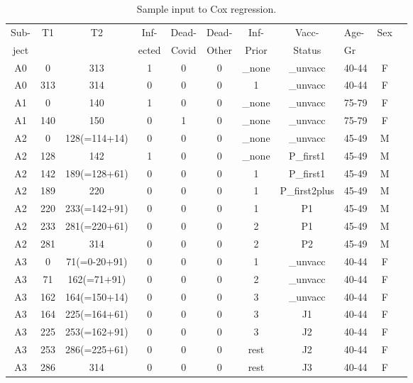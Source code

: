 \documentclass[preprint,12pt,authoryear]{elsarticle}
\begin{document}
\begin{table}
\caption{Sample input to Cox regression. \vspace{3mm}}
\label{tab:input}
\centering
\begin{tabular}{cccccccclcc}
\hline
Sub- & T1 & T2 & Inf- & Dead- & Dead- & Inf-& Vacc-& Age- & Sex \\
ject & & & ected & Covid & Other & Prior & Status & Gr & \\
\hline
A0 & 0 & 313 & 1 & 0& 0 & \_none & \_unvacc & 40-44 & F\\
A0 & 313 & 314 &0 & 0& 0&1 & \_unvacc & 40-44 & F\\
A1 & 0 & 140 & 1 &0 & 0 &\_none & \_unvacc & 75-79 & F\\
A1 & 140 & 150 & 0 & 1 & 0 & \_none &  \_unvacc & 75-79 & F\\
A2 & 0 & 128(=114+14) & 0& 0 & 0   & \_none &  \_unvacc  & 45-49 & M\\
A2 & 128 & 142 & 1 & 0 & 0 & \_none & P\_first1& 45-49 & M\\
A2 & 142 & 189(=128+61) & 0 & 0 & 0 & 1 & P\_first1& 45-49 & M\\
A2 & 189 & 220 & 0 & 0 &0 & 1 & P\_first2plus& 45-49 & M\\
A2 & 220 & 233(=142+91)  & 0 & 0& 0 & 1 & P1 & 45-49 & M\\
A2 & 233 & 281(=220+61) & 0 & 0 & 0 & 2 & P1 & 45-49 & M\\
A2 & 281 & 314 & 0 & 0 & 0 & 2 & P2 & 45-49 & M\\
A3 & 0 & 71(=0-20+91) & 0 &0 &0 & 1 & \_unvacc & 40-44 & F\\
A3 & 71 & 162(=71+91) & 0 &0 &0 & 2 & \_unvacc & 40-44 & F\\
A3 & 162 & 164(=150+14) & 0 &0 &0 & 3 & \_unvacc & 40-44 & F\\
A3 & 164 & 225(=164+61) & 0 & 0& 0 & 3 & J1 & 40-44 & F\\
A3 & 225 & 253(=162+91) & 0 & 0& 0 & 3 & J2 & 40-44 & F\\
A3 & 253 & 286(=225+61) & 0 & 0& 0 & rest & J2 & 40-44 & F\\
A3 & 286 & 314  & 0 & 0& 0 & rest & J3 & 40-44 & F\\
\hline
\end{tabular}
\end{table}
\end{document}
